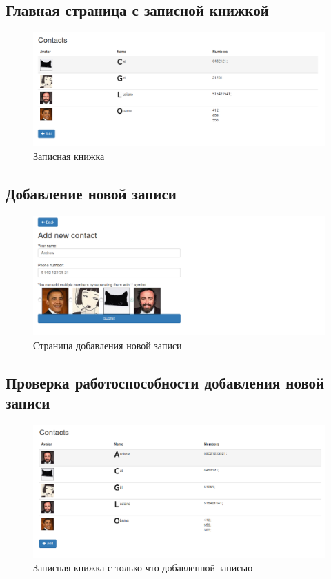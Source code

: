 \documentclass{article}
\begin{document}
\subsection{Главная страница с записной книжкой}
\begin{figure}[H]
	\begin{flushleft}
		\centerline{\includegraphics[scale=0.4]{phonebook.png}}
		\caption{Записная книжка}
	\end{flushleft}
\end{figure}
\vspace{3cm}

\subsection{Добавление новой записи}
\begin{figure}[H]
	\begin{flushleft}
		\centerline{\includegraphics[scale=0.4]{add.png}}
		\caption{Страница добавления новой записи}
	\end{flushleft}
\end{figure}

\subsection{Проверка работоспособности добавления новой записи}
\begin{figure}[H]
	\begin{flushleft}
		\centerline{\includegraphics[scale=0.4]{phonebooknew.png}}
		\caption{Записная книжка с только что добавленной записью}
	\end{flushleft}
\end{figure}
\end{document}
